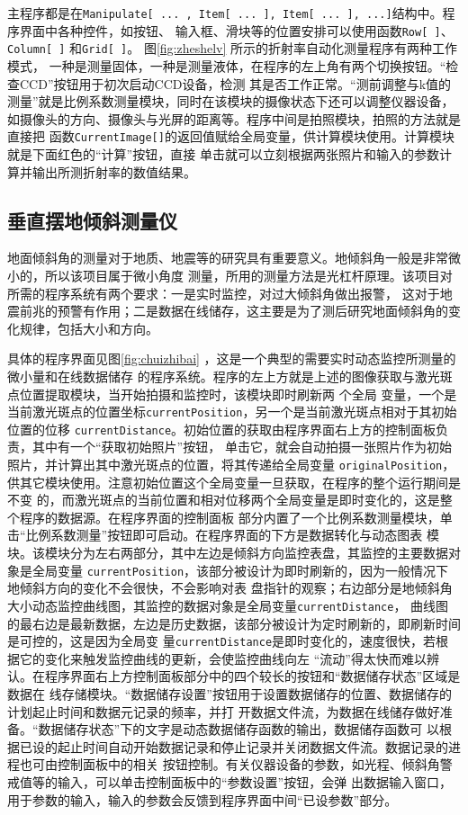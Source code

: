 \documentclass[UTF8,a4paper,12pt]{article}
\begin{document}
主程序都是在\verb|Manipulate[ ... , Item[ ... ], Item[ ... ], ...]|结构中。程序界面中各种控件，如按钮、
输入框、滑块等的位置安排可以使用函数\verb|Row[ ]|、\verb|Column[ ]| 和\verb|Grid[ ]|。
图\;\ref{fig:zheshelv} 所示的折射率自动化测量程序有两种工作模式，
一种是测量固体，一种是测量液体，在程序的左上角有两个切换按钮。``检查CCD''按钮用于初次启动CCD设备，检测
其是否工作正常。``测前调整与k值的测量''就是比例系数测量模块，同时在该模块的摄像状态下还可以调整仪器设备，
如摄像头的方向、摄像头与光屏的距离等。程序中间是拍照模块，拍照的方法就是直接把
函数\verb|CurrentImage[]|的返回值赋给全局变量，供计算模块使用。计算模块就是下面红色的``计算''按钮，直接
单击就可以立刻根据两张照片和输入的参数计算并输出所测折射率的数值结果。

\subsection{垂直摆地倾斜测量仪}

地面倾斜角的测量对于地质、地震等的研究具有重要意义。地倾斜角一般是非常微小的，所以该项目属于微小角度
测量，所用的测量方法是光杠杆原理。该项目对所需的程序系统有两个要求：一是实时监控，对过大倾斜角做出报警，
这对于地震前兆的预警有作用；二是数据在线储存，这主要是为了测后研究地面倾斜角的变化规律，包括大小和方向。

具体的程序界面见图\;\ref{fig:chuizhibai} ，这是一个典型的需要实时动态监控所测量的微小量和在线数据储存
的程序系统。程序的左上方就是上述的图像获取与激光斑点位置提取模块，当开始拍摄和监控时，该模块即时刷新两
个全局
变量，一个是当前激光斑点的位置坐标\verb|currentPosition|，另一个是当前激光斑点相对于其初始位置的位移
\verb|currentDistance|。初始位置的获取由程序界面右上方的控制面板负责，其中有一个``获取初始照片''按钮，
单击它，就会自动拍摄一张照片作为初始照片，并计算出其中激光斑点的位置，将其传递给全局变量
\verb|originalPosition|，供其它模块使用。注意初始位置这个全局变量一旦获取，在程序的整个运行期间是不变
的，而激光斑点的当前位置和相对位移两个全局变量是即时变化的，这是整个程序的数据源。在程序界面的控制面板
部分内置了一个比例系数测量模块，单击``比例系数测量''按钮即可启动。在程序界面的下方是数据转化与动态图表
模块。该模块分为左右两部分，其中左边是倾斜方向监控表盘，其监控的主要数据对象是全局变量
\verb|currentPosition|，该部分被设计为即时刷新的，因为一般情况下地倾斜方向的变化不会很快，不会影响对表
盘指针的观察；右边部分是地倾斜角大小动态监控曲线图，其监控的数据对象是全局变量\verb|currentDistance|，
曲线图的最右边是最新数据，左边是历史数据，该部分被设计为定时刷新的，即刷新时间是可控的，这是因为全局变
量\verb|currentDistance|是即时变化的，速度很快，若根据它的变化来触发监控曲线的更新，会使监控曲线向左
``流动''得太快而难以辨认。在程序界面右上方控制面板部分中的四个较长的按钮和``数据储存状态''区域是数据在
线存储模块。``数据储存设置''按钮用于设置数据储存的位置、数据储存的计划起止时间和数据元记录的频率，并打
开数据文件流，为数据在线储存做好准备。``数据储存状态''下的文字是动态数据储存函数的输出，数据储存函数可
以根据已设的起止时间自动开始数据记录和停止记录并关闭数据文件流。数据记录的进程也可由控制面板中的相关
按钮控制。有关仪器设备的参数，如光程、倾斜角警戒值等的输入，可以单击控制面板中的``参数设置''按钮，会弹
出数据输入窗口，用于参数的输入，输入的参数会反馈到程序界面中间``已设参数''部分。
\end{document}
